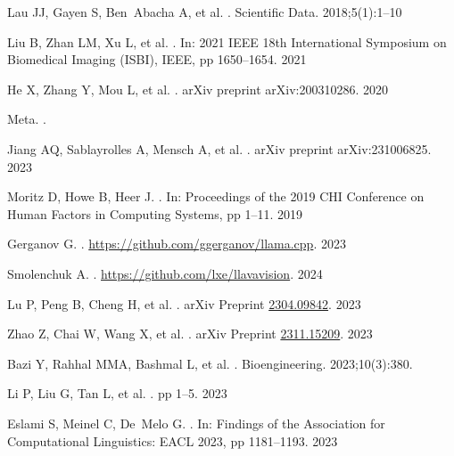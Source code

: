 \documentclass[10pt,letterpaper]{article}
\begin{document}
\begin{thebibliography}{10}
Lau JJ, Gayen S, Ben~Abacha A, et al.
.
\newblock Scientific Data. 2018;5(1):1--10

Liu B, Zhan LM, Xu L, et al.
.
\newblock In: 2021 IEEE 18th International Symposium on Biomedical Imaging (ISBI), IEEE, pp 1650--1654. 2021

He X, Zhang Y, Mou L, et al.
.
\newblock arXiv preprint arXiv:200310286. 2020

Meta.
.

Jiang AQ, Sablayrolles A, Mensch A, et al.
.
\newblock arXiv preprint arXiv:231006825. 2023

Moritz D, Howe B, Heer J.
.
\newblock In: Proceedings of the 2019 CHI Conference on Human Factors in Computing Systems, pp 1--11. 2019

Gerganov G.
.
\newblock \url{https://github.com/ggerganov/llama.cpp}. 2023

Smolenchuk A.
.
\newblock \url{https://github.com/lxe/llavavision}. 2024

Lu P, Peng B, Cheng H, et al.
.
\newblock arXiv Preprint {\href{https://arxiv.org/abs/2304.09842}{{2304.09842}}}. 2023

Zhao Z, Chai W, Wang X, et al.
.
\newblock arXiv Preprint {\href{https://arxiv.org/abs/2311.15209}{{2311.15209}}}. 2023

Bazi Y, Rahhal MMA, Bashmal L, et al.
.
\newblock Bioengineering. 2023;10(3):380.

Li P, Liu G, Tan L, et al.
.
\newblock pp 1--5. 2023

Eslami S, Meinel C, De~Melo G.
.
\newblock In: Findings of the Association for Computational Linguistics: EACL 2023, pp 1181--1193. 2023

\end{thebibliography}
\end{document}
